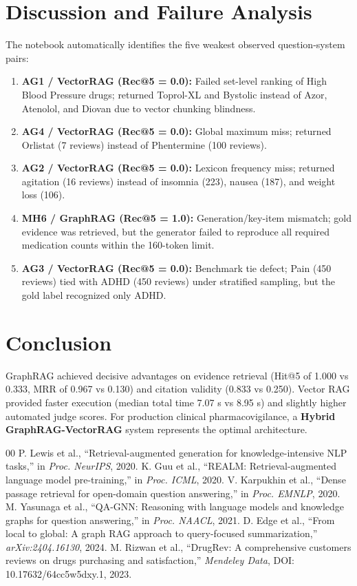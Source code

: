 \documentclass[conference]{IEEEtran}
\begin{document}
\section{Discussion and Failure Analysis}
The notebook automatically identifies the five weakest observed question-system pairs:
\begin{enumerate}
    \item \textbf{AG1 / VectorRAG (Rec@5 = 0.0):} Failed set-level ranking of High Blood Pressure drugs; returned Toprol-XL and Bystolic instead of Azor, Atenolol, and Diovan due to vector chunking blindness.
    \item \textbf{AG4 / VectorRAG (Rec@5 = 0.0):} Global maximum miss; returned Orlistat (7 reviews) instead of Phentermine (100 reviews).
    \item \textbf{AG2 / VectorRAG (Rec@5 = 0.0):} Lexicon frequency miss; returned agitation (16 reviews) instead of insomnia (223), nausea (187), and weight loss (106).
    \item \textbf{MH6 / GraphRAG (Rec@5 = 1.0):} Generation/key-item mismatch; gold evidence was retrieved, but the generator failed to reproduce all required medication counts within the 160-token limit.
    \item \textbf{AG3 / VectorRAG (Rec@5 = 0.0):} Benchmark tie defect; Pain (450 reviews) tied with ADHD (450 reviews) under stratified sampling, but the gold label recognized only ADHD.
\end{enumerate}

\section{Conclusion}
GraphRAG achieved decisive advantages on evidence retrieval (Hit@5 of 1.000 vs 0.333, MRR of 0.967 vs 0.130) and citation validity (0.833 vs 0.250). Vector RAG provided faster execution (median total time 7.07 s vs 8.95 s) and slightly higher automated judge scores. For production clinical pharmacovigilance, a \textbf{Hybrid GraphRAG-VectorRAG} system represents the optimal architecture.

\begin{thebibliography}{00}
 P. Lewis et al., ``Retrieval-augmented generation for knowledge-intensive NLP tasks,'' in \textit{Proc. NeurIPS}, 2020.
 K. Guu et al., ``REALM: Retrieval-augmented language model pre-training,'' in \textit{Proc. ICML}, 2020.
 V. Karpukhin et al., ``Dense passage retrieval for open-domain question answering,'' in \textit{Proc. EMNLP}, 2020.
 M. Yasunaga et al., ``QA-GNN: Reasoning with language models and knowledge graphs for question answering,'' in \textit{Proc. NAACL}, 2021.
 D. Edge et al., ``From local to global: A graph RAG approach to query-focused summarization,'' \textit{arXiv:2404.16130}, 2024.
 M. Rizwan et al., ``DrugRev: A comprehensive customers reviews on drugs purchasing and satisfaction,'' \textit{Mendeley Data}, DOI: 10.17632/64cc5w5dxy.1, 2023.
\end{thebibliography}
\end{document}
